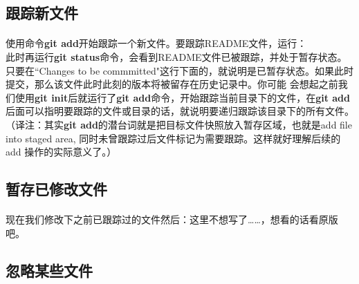 \documentclass{book}
\begin{document}
	\subsection{跟踪新文件}
	\paragraph{}
	使用命令\textbf{git add}开始跟踪一个新文件。要跟踪README文件，运行：\\
	此时再运行\textbf{git status}命令，会看到README文件已被跟踪，并处于暂存状态。\\
	只要在``Changes to be commmitted"这行下面的，就说明是已暂存状态。如果此时提交，那么该文件此时此刻的版本将被留存在历史记录中。你可能 会想起之前我们使用\textbf{git init}后就运行了\textbf{git add}命令，开始跟踪当前目录下的文件，在\textbf{git add}后面可以指明要跟踪的文件或目录的话，就说明要递归跟踪该目录下的所有文件。（译注：其实\textbf{git add}的潜台词就是把目标文件快照放入暂存区域，也就是add file into staged area, 同时未曾跟踪过后文件标记为需要跟踪。这样就好理解后续的add 操作的实际意义了。）\\
	\subsection{暂存已修改文件}
	\paragraph{}
	现在我们修改下之前已跟踪过的文件然后：这里不想写了……，想看的话看原版吧。\\
	\subsection{忽略某些文件}
\end{document}

